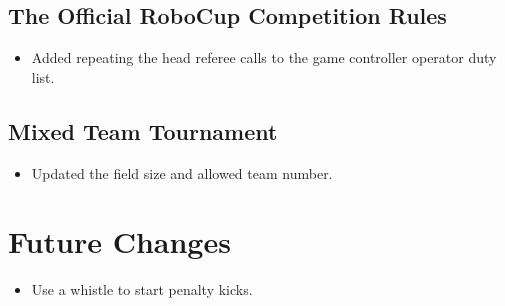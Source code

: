 \documentclass[12pt]{article}
\begin{document}
\subsection*{The Official RoboCup Competition Rules}
\begin{itemize}
  \item Added repeating the head referee calls to the game controller operator duty list.
\end{itemize}

\subsection*{Mixed Team Tournament}
\begin{itemize}
  \item Updated the field size and allowed team number.
\end{itemize}

\section{Future Changes}
\begin{itemize}
  \item Use a whistle to start penalty kicks.
\end{itemize}
\end{document}
